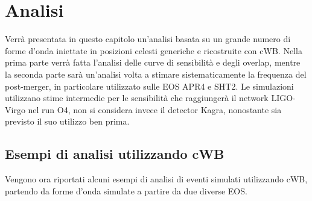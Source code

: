 \chapter{Analisi}
\label{chapter:analisi}
Verrà presentata in questo capitolo un'analisi basata su un grande numero di forme d'onda iniettate in posizioni celesti generiche e ricostruite con cWB. Nella prima parte verrà fatta l'analisi delle curve di sensibilità e degli overlap, mentre la seconda parte sarà un'analisi volta a stimare sistematicamente la frequenza del post-merger, in particolare utilizzato sulle EOS APR4 e SHT2.
Le simulazioni utilizzano stime intermedie per le sensibilità che raggiungerà il network LIGO-Virgo nel run O4, non si considera invece il detector Kagra, nonostante sia previsto il suo utilizzo ben prima.

\section{Esempi di analisi utilizzando cWB}
\label{section:examples}
Vengono ora riportati alcuni esempi di analisi di eventi simulati utilizzando cWB, partendo da forme d'onda simulate a partire da due diverse EOS. 
